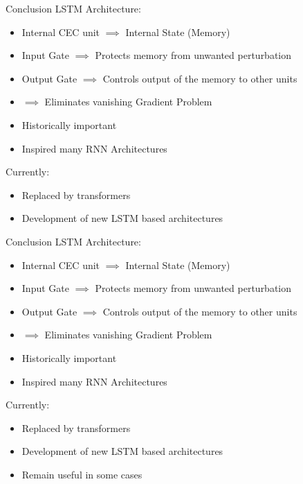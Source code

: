 \documentclass[10pt, aspectratio=169]{beamer}
\begin{document}
\begin{frame}[t]{Conclusion}
LSTM Architecture:
\begin{itemize}
    \item Internal CEC unit \begin{math}\implies \end{math} Internal State (Memory)
    \item Input Gate \begin{math}\implies\end{math} Protects memory from unwanted perturbation
    \item Output Gate \begin{math}\implies\end{math} Controls output of the memory to other units
    \item \begin{math}\implies\end{math} Eliminates vanishing Gradient Problem
    \item Historically important 
    \item Inspired many RNN Architectures
\end{itemize}
Currently:
\begin{itemize}
    \item Replaced by transformers
    \item Development of new LSTM based architectures
\end{itemize}
\end{frame}

\begin{frame}[t]{Conclusion}
LSTM Architecture:
\begin{itemize}
    \item Internal CEC unit \begin{math}\implies \end{math} Internal State (Memory)
    \item Input Gate \begin{math}\implies\end{math} Protects memory from unwanted perturbation
    \item Output Gate \begin{math}\implies\end{math} Controls output of the memory to other units
    \item \begin{math}\implies\end{math} Eliminates vanishing Gradient Problem
    \item Historically important 
    \item Inspired many RNN Architectures
\end{itemize}
Currently:
\begin{itemize}
    \item Replaced by transformers
    \item Development of new LSTM based architectures
    \item Remain useful in some cases
\end{itemize}
\end{frame}
\end{document}
